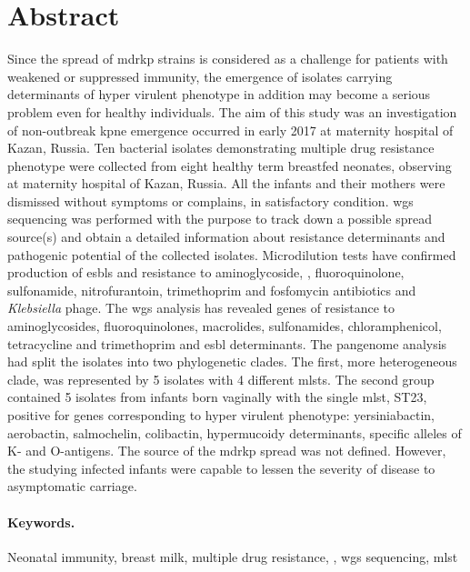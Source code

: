 \section*{Abstract}\label{sec:abstract}

Since the spread of \gls{mdrkp} strains is considered as a challenge for patients with weakened or suppressed immunity,
the emergence of isolates carrying determinants of hyper virulent phenotype in addition may become a serious
problem even for healthy individuals.
The aim of this study was an investigation of non-outbreak \gls{kpne} emergence occurred in early 2017
at maternity hospital of Kazan, Russia.
Ten bacterial isolates demonstrating multiple drug resistance phenotype were collected from eight
healthy term breastfed neonates, observing at maternity hospital of Kazan, Russia.
All the infants and their mothers were dismissed without symptoms or complains, in satisfactory
condition.
\Gls{wgs} sequencing was performed with the purpose to track down a possible spread source(s) and
obtain a detailed information about resistance determinants and pathogenic potential of the
collected isolates.
Microdilution tests have confirmed production of \glspl{esbl} and resistance to aminoglycoside, \betalactam,
fluoroquinolone, sulfonamide, nitrofurantoin, trimethoprim and fosfomycin antibiotics and \textit{Klebsiella} phage.
The \gls{wgs} analysis has revealed genes of resistance to aminoglycosides, fluoroquinolones, macrolides,
sulfonamides, chloramphenicol, tetracycline and trimethoprim and \gls{esbl} determinants.
The pangenome analysis had split the isolates into two phylogenetic clades.
The first, more heterogeneous clade, was represented by 5 isolates with 4 different \glspl{mlst}.
The second group contained 5 isolates from infants born vaginally with the single \gls{mlst}, ST23, positive for
genes corresponding to hyper virulent phenotype: yersiniabactin, aerobactin, salmochelin, colibactin, hypermucoidy
determinants, specific alleles of K- and O-antigens.
The source of the \gls{mdrkp} spread was not defined.
However, the studying infected infants were capable to lessen the severity of disease to
asymptomatic carriage.

\paragraph{Keywords.}
Neonatal immunity, breast milk, multiple drug resistance, , \glsdesc{wgs} sequencing, \glsdesc{mlst}
\glsresetall
